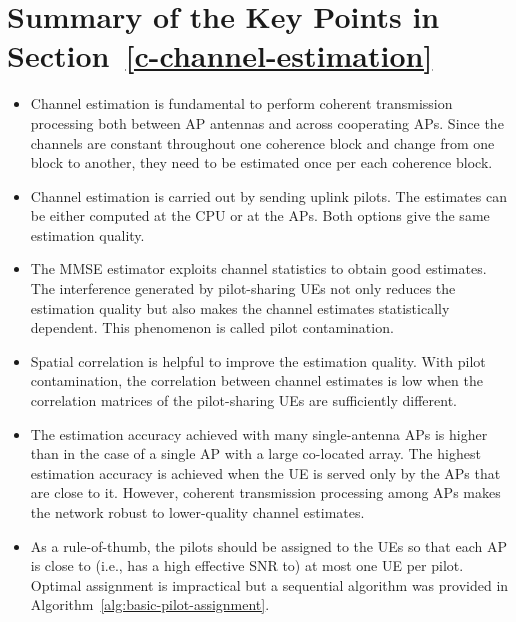 \newpage
\section{Summary of the Key Points in Section~\ref{c-channel-estimation}}
\label{c-channel-estimation-summary}

\begin{mdframed}[style=GrayFrame]

\begin{itemize}
\item Channel estimation is fundamental to perform coherent transmission processing both between AP antennas and across cooperating APs. Since the channels are constant throughout one coherence block and change from one block to another, they need to be estimated once per each
coherence block.

\item Channel estimation is carried out by sending uplink pilots. The estimates can be either computed at the CPU or at the APs. Both options give the same estimation quality.

\item The MMSE estimator exploits channel statistics to obtain good estimates. The interference generated by pilot-sharing UEs not only reduces the estimation quality but also makes the channel estimates statistically dependent. This phenomenon is called pilot contamination.



\item Spatial correlation is helpful to improve the estimation quality. With pilot contamination, the correlation between channel estimates is low when the correlation matrices of the pilot-sharing UEs are sufficiently different.
 
\item The estimation accuracy achieved with many single-antenna APs is higher than in the case of a single AP with a large co-located array. The highest estimation accuracy is achieved when the UE is served only by the APs that are close to it. However, coherent transmission processing among APs makes the network robust to lower-quality channel estimates.

\item As a rule-of-thumb, the pilots should be assigned to the UEs so that each AP is close to (i.e., has a high effective SNR to) at most one UE per pilot. Optimal assignment is impractical but a sequential algorithm was provided in Algorithm~\ref{alg:basic-pilot-assignment}.

\end{itemize}

\end{mdframed}

 







